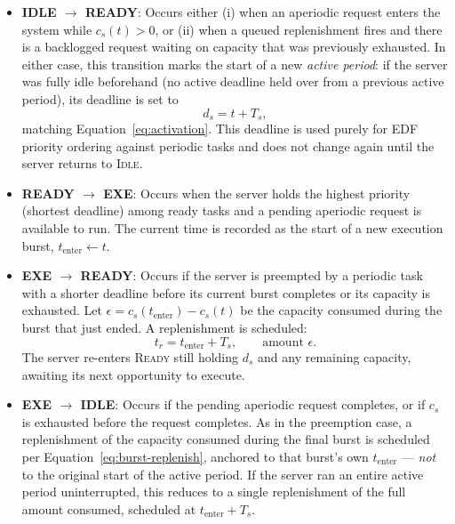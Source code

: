 \documentclass[conference]{IEEEtran}
\begin{document}
    \begin{itemize}
        \item \textbf{IDLE $\to$ READY}: Occurs either (i) when an aperiodic request enters the system while $c_s(t) > 0$, or (ii) when a queued replenishment fires and there is a backlogged request waiting on capacity that was previously exhausted. In either case, this transition marks the start of a new \emph{active period}: if the server was fully idle beforehand (no active deadline held over from a previous active period), its deadline is set to
        \begin{equation}
            d_s = t + T_s,
            \label{eq:activation2}
        \end{equation}
        matching Equation~\ref{eq:activation}. This deadline is used purely for EDF priority ordering against periodic tasks and does not change again until the server returns to \textsc{Idle}.

        \item \textbf{READY $\to$ EXE}: Occurs when the server holds the highest priority (shortest deadline) among ready tasks and a pending aperiodic request is available to run. The current time is recorded as the start of a new execution burst, $t_{\mathrm{enter}} \leftarrow t$.

        \item \textbf{EXE $\to$ READY}: Occurs if the server is preempted by a periodic task with a shorter deadline before its current burst completes or its capacity is exhausted. Let $\epsilon = c_s(t_{\mathrm{enter}}) - c_s(t)$ be the capacity consumed during the burst that just ended. A replenishment is scheduled:
        \begin{equation}
            t_r = t_{\mathrm{enter}} + T_s, \qquad \text{amount } \epsilon.
            \label{eq:burst-replenish}
        \end{equation}
        The server re-enters \textsc{Ready} still holding $d_s$ and any remaining capacity, awaiting its next opportunity to execute.

        \item \textbf{EXE $\to$ IDLE}: Occurs if the pending aperiodic request completes, or if $c_s$ is exhausted before the request completes. As in the preemption case, a replenishment of the capacity consumed during the final burst is scheduled per Equation~\ref{eq:burst-replenish}, anchored to that burst's own $t_{\mathrm{enter}}$ — \emph{not} to the original start of the active period. If the server ran an entire active period uninterrupted, this reduces to a single replenishment of the full amount consumed, scheduled at $t_{\mathrm{enter}} + T_s$.
    \end{itemize}
\end{document}
